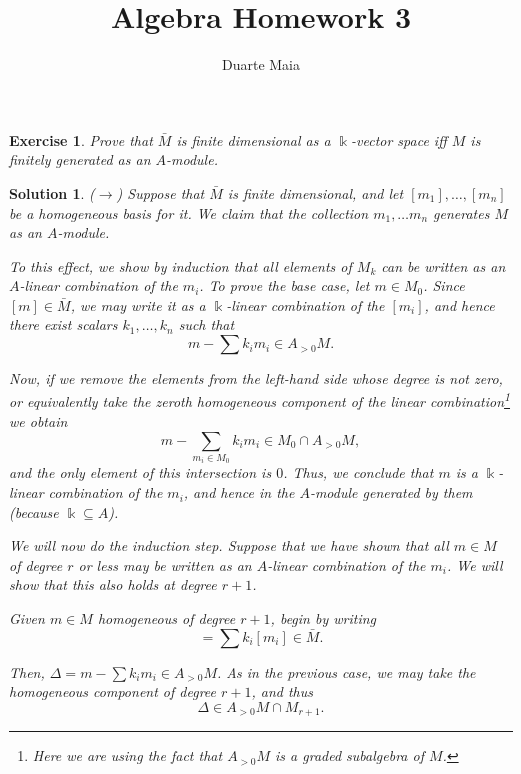 \documentclass{article}
\title{Algebra Homework 3}
\author{Duarte Maia}
\newtheorem{ex}{Exercise}
\theoremstyle{nonumberplain}
\newtheorem{sol}{Solution}
\newcommand{\kk}{\Bbbk}
\begin{document}
\maketitle

\begin{ex}
Prove that $\bar M$ is finite dimensional as a $\kk$-vector space iff $M$ is finitely generated as an $A$-module.
\end{ex}

\begin{sol}
($\rightarrow$) Suppose that $\bar M$ is finite dimensional, and let $[m_1], \dots, [m_n]$ be a homogeneous basis for it. We claim that the collection $m_1, \dots m_n$ generates $M$ as an $A$-module.

To this effect, we show by induction that all elements of $M_k$ can be written as an $A$-linear combination of the $m_i$. To prove the base case, let $m \in M_0$. Since $[m] \in \bar M$, we may write it as a $\kk$-linear combination of the $[m_i]$, and hence there exist scalars $k_1, \dots, k_n$ such that
\begin{equation}
m - \sum k_i m_i \in A_{>0} M.
\end{equation}

Now, if we remove the elements from the left-hand side whose degree is not zero, or equivalently take the zeroth homogeneous component of the linear combination\footnote{Here we are using the fact that $A_{>0} M$ is a graded subalgebra of $M$.} we obtain
\begin{equation}
m - \sum_{m_i \in M_0} k_i m_i \in M_0 \cap A_{>0} M,
\end{equation}
and the only element of this intersection is $0$. Thus, we conclude that $m$ is a $\kk$-linear combination of the $m_i$, and hence in the $A$-module generated by them (because $\kk \subseteq A$).

We will now do the induction step. Suppose that we have shown that all $m \in M$ of degree $r$ or less may be written as an $A$-linear combination of the $m_i$. We will show that this also holds at degree $r+1$.

Given $m \in M$ homogeneous of degree $r+1$, begin by writing
\begin{equation}
[m] = \sum k_i [m_i] \in \bar M.
\end{equation}

Then, $\Delta = m - \sum k_i m_i \in A_{>0} M$. As in the previous case, we may take the homogeneous component of degree $r+1$, and thus
\begin{equation}
\Delta \in A_{>0} M \cap M_{r+1}.
\end{equation}


\end{sol}
\end{document}
